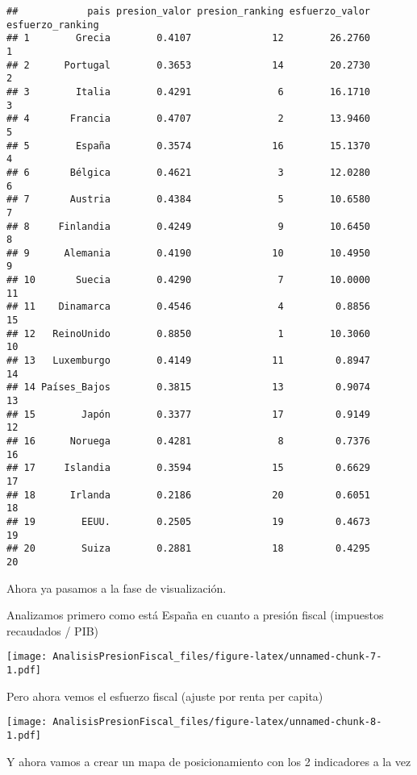 \documentclass[
]{article}
\begin{document}
\begin{verbatim}
##            pais presion_valor presion_ranking esfuerzo_valor esfuerzo_ranking
## 1        Grecia        0.4107              12        26.2760                1
## 2      Portugal        0.3653              14        20.2730                2
## 3        Italia        0.4291               6        16.1710                3
## 4       Francia        0.4707               2        13.9460                5
## 5        España        0.3574              16        15.1370                4
## 6       Bélgica        0.4621               3        12.0280                6
## 7       Austria        0.4384               5        10.6580                7
## 8     Finlandia        0.4249               9        10.6450                8
## 9      Alemania        0.4190              10        10.4950                9
## 10       Suecia        0.4290               7        10.0000               11
## 11    Dinamarca        0.4546               4         0.8856               15
## 12   ReinoUnido        0.8850               1        10.3060               10
## 13   Luxemburgo        0.4149              11         0.8947               14
## 14 Países_Bajos        0.3815              13         0.9074               13
## 15        Japón        0.3377              17         0.9149               12
## 16      Noruega        0.4281               8         0.7376               16
## 17     Islandia        0.3594              15         0.6629               17
## 18      Irlanda        0.2186              20         0.6051               18
## 19        EEUU.        0.2505              19         0.4673               19
## 20        Suiza        0.2881              18         0.4295               20
\end{verbatim}

\pagebreak

Ahora ya pasamos a la fase de visualización.

Analizamos primero como está España en cuanto a presión fiscal
(impuestos recaudados / PIB)

\texttt{[image: AnalisisPresionFiscal\_files/figure-latex/unnamed-chunk-7-1.pdf]}

\pagebreak

Pero ahora vemos el esfuerzo fiscal (ajuste por renta per capita)

\texttt{[image: AnalisisPresionFiscal\_files/figure-latex/unnamed-chunk-8-1.pdf]}

\pagebreak

Y ahora vamos a crear un mapa de posicionamiento con los 2 indicadores a
la vez
\end{document}
